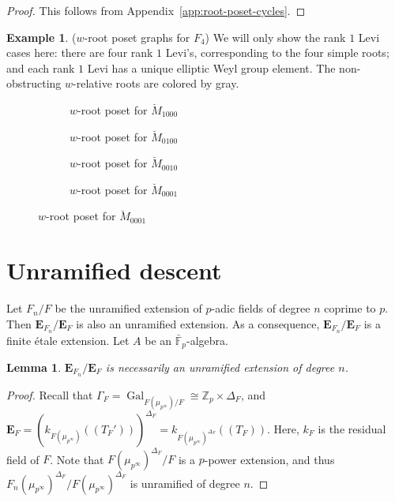 \documentclass[11pt]{amsart}
\newtheorem{lem}[thm]{Lemma}
\theoremstyle{definition}
\newtheorem{example}[thm]{Example}
\newcommand{\Z}{\mathbb{Z}}
\newcommand{\bfE}{\mathbf{E}}
\newcommand{\bFp}{\bar{\mathbb{F}}_p}
\newcommand{\bM}{\breve{M}}
\DeclareMathOperator{\Gal}{Gal}
\begin{document}
\begin{proof}
This follows from Appendix~\ref{app:root-poset-cycles}.
\end{proof}

\begin{example}
($w$-root poset graphs for $F_4$)
We will only show the rank $1$ Levi cases here:
there are four rank $1$ Levi's, corresponding to the four
simple roots;
and each rank $1$ Levi has a unique elliptic Weyl group element.
The non-obstructing $w$-relative roots are colored by gray.

\begin{figure}[H]
\begin{subfigure}{0.24\textwidth}
\centering
\scalebox{.7}{
\FwPosetA
}
\caption{$w$-root poset for $\bM_{1000}$}
\end{subfigure}
\begin{subfigure}{0.24\textwidth}
\centering
\scalebox{.7}{
\FwPosetB
}
\caption{$w$-root poset for $\bM_{0100}$}
\end{subfigure}
\begin{subfigure}{0.26\textwidth}
\centering
\scalebox{.7}{
\FwPosetC
}
\caption{$w$-root poset for $\bM_{0010}$}
\end{subfigure}
\begin{subfigure}{0.24\textwidth}
\centering
\scalebox{.7}{
\FwPosetD
}
\caption{$w$-root poset for $\bM_{0001}$}
\end{subfigure}
\end{figure}
\end{example}

\section{Unramified descent}
Let $F_n/F$ be the
unramified extension
of $p$-adic fields
of degree $n$ coprime to $p$.
Then $\bfE_{F_n}/\bfE_F$ is
also an unramified extension.
As a consequence,
$\bfE_{F_n}/\bfE_F$ is a
finite \'etale extension.
Let $A$ be an $\bFp$-algebra.

\begin{lem}
$\bfE_{F_n}/\bfE_{F}$
is necessarily an unramified extension of degree $n$.
\end{lem}

\begin{proof}
Recall that $\Gamma_F=\Gal_{F(\mu_{p^\infty})/F}
\cong \Z_p \times \Delta_F$,
and 
$\bfE_{F}= (k_{F(\mu_{p^\infty})}(\!(T_{F}')\!))^{\Delta_F}
=
k_{F(\mu_{p^\infty})^{\Delta_F}}(\!(T_{F})\!)
$.
Here, $k_F$ is the residual field of $F$.
Note that
$F(\mu_{p^\infty})^{\Delta_F}/F$ is a $p$-power extension,
and thus
$F_n(\mu_{p^\infty})^{\Delta_F}/F(\mu_{p^\infty})^{\Delta_F}$
is unramified of degree $n$.
\end{proof}
\end{document}
